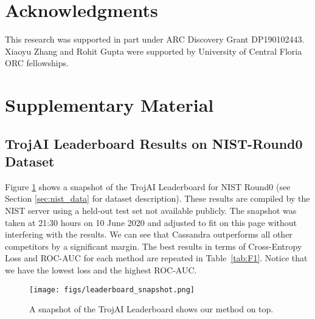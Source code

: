 \documentclass{article}
\begin{document}
\section*{Acknowledgments}
This research  was supported in part under ARC Discovery Grant DP190102443. Xiaoyu Zhang and Rohit Gupta were supported by University of Central Floria ORC fellowships. 




\section*{Supplementary Material}
\vspace{-3mm}
\subsection*{TrojAI Leaderboard Results on NIST-Round0 Dataset}
\vspace{-3mm}
\label{sec:leaderboard}

Figure \ref{fig:TrojAI_LB} shows a snapshot of the TrojAI Leaderboard for NIST Round0 (see Section \ref{sec:nist_data} for dataset description). These results are compiled by the NIST server using a held-out test set not available publicly. The snapshot was taken at 21:30 hours on 10 June 2020 and adjusted to fit on this page without interfering with the results. We can see that Cassandra outperforms all other competitors by a significant margin. The best results in terms of Cross-Entropy Loss and ROC-AUC for each method are repeated in Table~\ref{tab:F1}.  Notice that we have the lowest loss and the highest ROC-AUC.

\begin{figure}[h!]
\centering
\texttt{[image: figs/leaderboard\_snapshot.png]}
\caption{A snapshot of the TrojAI Leaderboard shows our method on top.}
\label{fig:TrojAI_LB}
\end{figure}
\end{document}
